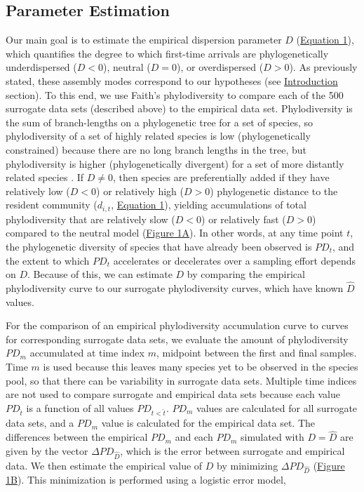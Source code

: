 \documentclass{article}
\begin{document}
\subsection{Parameter Estimation} \label{sec:parameterEstimation}
Our main goal is to estimate the empirical dispersion parameter \(D\) (\hyperref[sec:equation1]{Equation 1}), which quantifies the degree to which first-time arrivals are phylogenetically underdispersed (\(D<0\)), neutral (\(D=0\)), or overdispersed (\(D>0\)). As previously stated, these assembly modes correspond to our hypotheses (see \hyperref[sec:introduction]{Introduction} section). To this end, we use Faith's phylodiversity \cite{Faith1992} to compare each of the 500 surrogate data sets (described above) to the empirical data set. Phylodiversity is the sum of branch-lengths on a phylogenetic tree for a set of species, so phylodiversity of a set of highly related species is low (phylogenetically constrained) because there are no long branch lengths in the tree, but phylodiversity is higher (phylogenetically divergent) for a set of more distantly related species \cite{Faith1992}. If \(D\neq0\), then species are preferentially added if they have relatively low (\(D<0\)) or relatively high (\(D>0\)) phylogenetic distance to the resident community (\(d_{i,t}\), \hyperref[sec:equation1]{Equation 1}), yielding accumulations of total phylodiversity that are relatively slow (\(D<0\)) or relatively fast (\(D>0\)) compared to the neutral model (\hyperref[sec:figure1]{Figure 1A}). In other words, at any time point \(t\), the phylogenetic diversity of species that have already been observed is \(PD_t\), and the extent to which \(PD_t\) accelerates or decelerates over a sampling effort depends on \(D\). Because of this, we can estimate \(D\) by comparing the empirical phylodiversity curve to our surrogate phylodiversity curves, which have known \(\hat{D}\) values.
 \par
For the comparison of an empirical phylodiversity accumulation curve to curves for corresponding surrogate data sets, we evaluate the amount of phylodiversity \(PD_m\) accumulated at time index \(m\), midpoint between the first and final samples. Time \(m\) is used because this leaves many species yet to be observed in the species pool, so that there can be variability in surrogate data sets. Multiple time indices are not used to compare surrogate and empirical data sets because each value \(PD_{\hat{t}}\) is a function of all values \(PD_{t<\hat{t}}\). \(PD_m\) values are calculated for all surrogate data sets, and a \(PD_m\) value is calculated for the empirical data set. The differences between the empirical \(PD_m\) and each \(PD_m\) simulated with \(D=\hat{D}\) are given by the vector \(\Delta PD_{\hat{D}}\), which is the error between surrogate and empirical data. We then estimate the empirical value of \(D\) by minimizing \(\Delta PD_{\hat{D}}\) (\hyperref[sec:figure1]{Figure 1B}). This minimization is performed using a logistic error model,
\end{document}

